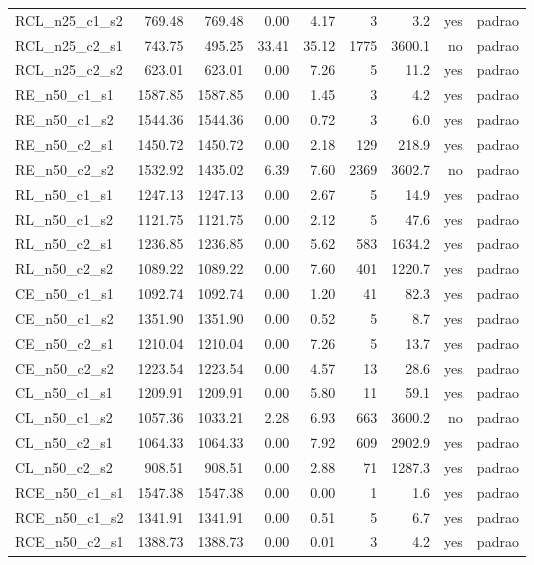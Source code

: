 \begin{tabular}{lrrrrrrrl}
RCL\_n25\_c1\_s2 & 769.48 & 769.48 & 0.00 & 4.17 & 3 & 3.2 & yes & padrao \\
RCL\_n25\_c2\_s1 & 743.75 & 495.25 & 33.41 & 35.12 & 1775 & 3600.1 & no & padrao \\
RCL\_n25\_c2\_s2 & 623.01 & 623.01 & 0.00 & 7.26 & 5 & 11.2 & yes & padrao \\
\midrule
RE\_n50\_c1\_s1 & 1587.85 & 1587.85 & 0.00 & 1.45 & 3 & 4.2 & yes & padrao \\
RE\_n50\_c1\_s2 & 1544.36 & 1544.36 & 0.00 & 0.72 & 3 & 6.0 & yes & padrao \\
RE\_n50\_c2\_s1 & 1450.72 & 1450.72 & 0.00 & 2.18 & 129 & 218.9 & yes & padrao \\
RE\_n50\_c2\_s2 & 1532.92 & 1435.02 & 6.39 & 7.60 & 2369 & 3602.7 & no & padrao \\
RL\_n50\_c1\_s1 & 1247.13 & 1247.13 & 0.00 & 2.67 & 5 & 14.9 & yes & padrao \\
RL\_n50\_c1\_s2 & 1121.75 & 1121.75 & 0.00 & 2.12 & 5 & 47.6 & yes & padrao \\
RL\_n50\_c2\_s1 & 1236.85 & 1236.85 & 0.00 & 5.62 & 583 & 1634.2 & yes & padrao \\
RL\_n50\_c2\_s2 & 1089.22 & 1089.22 & 0.00 & 7.60 & 401 & 1220.7 & yes & padrao \\
CE\_n50\_c1\_s1 & 1092.74 & 1092.74 & 0.00 & 1.20 & 41 & 82.3 & yes & padrao \\
CE\_n50\_c1\_s2 & 1351.90 & 1351.90 & 0.00 & 0.52 & 5 & 8.7 & yes & padrao \\
CE\_n50\_c2\_s1 & 1210.04 & 1210.04 & 0.00 & 7.26 & 5 & 13.7 & yes & padrao \\
CE\_n50\_c2\_s2 & 1223.54 & 1223.54 & 0.00 & 4.57 & 13 & 28.6 & yes & padrao \\
CL\_n50\_c1\_s1 & 1209.91 & 1209.91 & 0.00 & 5.80 & 11 & 59.1 & yes & padrao \\
CL\_n50\_c1\_s2 & 1057.36 & 1033.21 & 2.28 & 6.93 & 663 & 3600.2 & no & padrao \\
CL\_n50\_c2\_s1 & 1064.33 & 1064.33 & 0.00 & 7.92 & 609 & 2902.9 & yes & padrao \\
CL\_n50\_c2\_s2 & 908.51 & 908.51 & 0.00 & 2.88 & 71 & 1287.3 & yes & padrao \\
RCE\_n50\_c1\_s1 & 1547.38 & 1547.38 & 0.00 & 0.00 & 1 & 1.6 & yes & padrao \\
RCE\_n50\_c1\_s2 & 1341.91 & 1341.91 & 0.00 & 0.51 & 5 & 6.7 & yes & padrao \\
RCE\_n50\_c2\_s1 & 1388.73 & 1388.73 & 0.00 & 0.01 & 3 & 4.2 & yes & padrao \\

\end{tabular}
